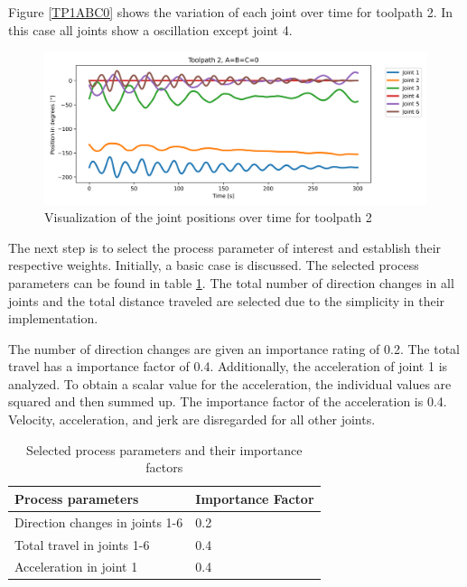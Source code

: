  Figure \ref{TP1ABC0} shows the variation of each joint over time for toolpath 2.
 In this case all joints show a oscillation except joint 4.
\begin{figure}[H]
	\centerline{\includegraphics[width=1\textwidth]{figures/TP2ABC0.png}}
	\caption{Visualization of the joint positions over time for toolpath 2}
	\label{TP2ABC0}
\end{figure}

The next step is to select the process parameter of interest and establish their respective weights. Initially, a basic case is discussed. The selected process parameters can be found in table \ref{PPbasic}. The total number of direction changes in all joints and the total distance traveled are selected due to the simplicity in their implementation.

The number of direction changes are given an importance rating of 0.2.
The total travel has a importance factor of 0.4. Additionally, the acceleration of joint 1 is analyzed. To obtain a scalar value for the acceleration, the individual values are squared and then summed up. The importance factor of the acceleration is 0.4.
Velocity, acceleration, and jerk are disregarded for all other joints.

\begin{table}[H]
	\centering
	\begin{tabular}{||l|l||}
		Process parameters& Importance Factor \\
		\hline
		\hline
		\hline
		Direction changes in joints 1-6	&		0.2 \\
		Total travel in joints 1-6	&  	0.4 \\
		Acceleration in joint 1	& 		0.4\\
		
		\hline
		\hline
	\end{tabular}
	
	\caption{Selected process parameters and their importance factors}
	\label{PPbasic}
\end{table}


